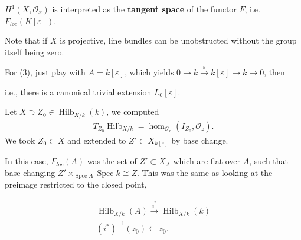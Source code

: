 \begin{description}
\tightlist
\item[Note (\#3)]
\(H^1(X, {\mathcal{O}}_x)\) is interpreted as the \textbf{tangent space}
of the functor \(F\), i.e.~\(F_{loc}(K[\varepsilon])\).
\end{description}

Note that if \(X\) is projective, line bundles can be unobstructed
without the group itself being zero.

For (3), just play with \(A = k[\varepsilon]\), which yields
\(0 \to k \xrightarrow{\varepsilon} k[\varepsilon] \to k \to 0\), then

\begin{center}
\end{center}

i.e., there is a canonical trivial extension \(L_0[\varepsilon]\).

\begin{description}
\tightlist
\item[Example]
Let \(X \supset Z_0 \in \operatorname{Hilb}_{X/k}(k)\), we computed
\begin{align*}
  T_{Z_0} \operatorname{Hilb}_{X/k} =  \hom_{{\mathcal{O}}_x}(I_{Z_0}, {\mathcal{O}}_z)
  .\end{align*}
We took \(Z_0 \subset X\) and extended to
\(Z' \subset X_{k[\varepsilon]}\) by base change.
\end{description}

In this case, \(F_{loc}(A)\) was the set of \(Z'\subset X_A\) which are
flat over \(A\), such that base-changing
\(Z' \times_{\operatorname{Spec}A} \operatorname{Spec}k \cong Z\). This
was the same as looking at the preimage restricted to the closed point,

\begin{align*}   \operatorname{Hilb}_{X/k}(A) \xrightarrow{i^*} \operatorname{Hilb}_{X/k}(k) \\   (i^*)^{-1}(z_0) \mapsfrom z_0   .\end{align*}

